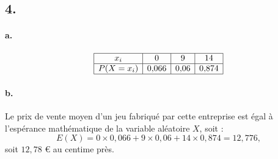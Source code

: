 \documentclass[10pt]{article}
\begin{document}
\subsection*{4.}

\paragraph{a.}
\[
\begin{array}{|c|c|c|c|}
\hline
x_i & 0 & 9 & 14 \\
\hline
P(X = x_i) & 0{,}066 & 0{,}06 & 0{,}874 \\
\hline
\end{array}
\]

\paragraph{b.} Le prix de vente moyen d'un jeu fabriqué par cette entreprise est égal à l'espérance mathématique de la variable aléatoire \(X\), soit :
\[
E(X) = 0 \times 0{,}066 + 9 \times 0{,}06 + 14 \times 0{,}874 = 12{,}776,
\]
soit \( 12{,}78 \) € au centime près.
\end{document}

